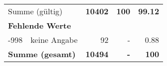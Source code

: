 \begin{longtable}{lXrrr}
     \midrule
     \multicolumn{2}{l}{Summe (gültig)} &
       \textbf{\num{10402}} &
     \textbf{\num{100}} &
       \textbf{\num[round-mode=places,round-precision=2]{99.12}} \\
     \multicolumn{5}{l}{\textbf{Fehlende Werte}}\\
       -998 &
       keine Angabe &
         \num{92} &
        - &
         \num[round-mode=places,round-precision=2]{0.88} \\
     \midrule
     \multicolumn{2}{l}{\textbf{Summe (gesamt)}} &
          \textbf{\num{10494}} &
        \textbf{-} &
        \textbf{\num{100}} \\
     \bottomrule
     \end{longtable}
     
